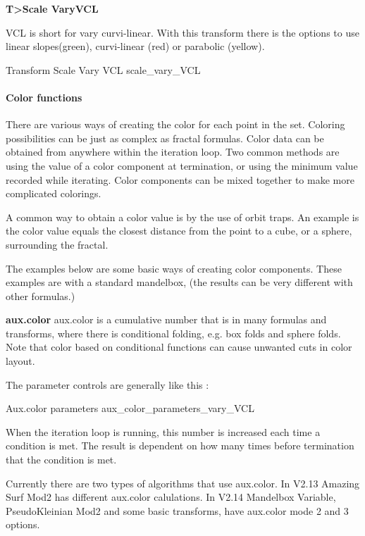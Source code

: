 \textbf{T>Scale VaryVCL}

VCL is short for vary curvi-linear. With this transform there is the options to use linear slopes(green), curvi-linear (red) or parabolic (yellow).

{Transform Scale Vary VCL}
{scale_vary_VCL}




\paragraph{Color functions}

There are various ways of creating the color for each point in the set. Coloring possibilities  can be just as complex as fractal formulas. Color data can be obtained from anywhere within the iteration loop. Two common methods are using the value of a color component at termination, or using the minimum value recorded while iterating. Color components can be mixed together to make more complicated colorings.

A common way to obtain a color value is by the use of orbit traps. An example is the color value equals the closest distance from the point to a cube, or a sphere, surrounding the fractal.

The examples below are some basic ways of creating color components. These examples are with a standard  mandelbox, (the results can be very different with other formulas.)


\textbf{aux.color}
aux.color is a cumulative number that is in many formulas and transforms,  where there is conditional folding, e.g. box folds and sphere folds. Note that color based on conditional functions can cause unwanted cuts in color layout.

The parameter controls are generally like this :

{Aux.color parameters}
{aux_color_parameters_vary_VCL}

When the iteration loop is running, this number is increased each time a condition is met.  The result is dependent on how many times before termination  that the condition is met.

Currently there are two types of algorithms that use aux.color. In V2.13 Amazing Surf Mod2 has different aux.color calulations. In V2.14 Mandelbox Variable, PseudoKleinian Mod2 and some basic transforms, have aux.color mode 2 and 3 options.

